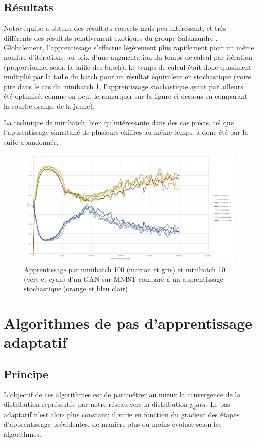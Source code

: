 \subsection{Résultats}
Notre équipe a obtenu des résultats corrects mais peu intéressant, et très différents des résultats relativement exotiques du groupe Salamandre \cite{bouvier_dyvoire_dessine-moi_2018}.
Globalement, l'apprentissage s'effectue légèrement plus rapidement pour un même nombre d'itérations, au prix d'une augmentation du temps de calcul par itération (proportionnel selon la taille des batch). Le temps de calcul était donc quasiment multiplié par la taille du batch pour un résultat équivalent en stochastique (voire pire dans le cas du minibatch 1, l'apprentissage stochastique ayant par ailleurs été optimisé, comme on peut le remarquer sur la figure ci-dessous en comparant la courbe orange de la jaune).

La technique de minibatch, bien qu'intéressante dans des cas précis, tel que l'apprentissage simultané de plusieurs chiffres au même temps, a donc été par la suite abandonnée.

\begin{figure}[h]
\begin{center}
\includegraphics[width=1\textwidth]{images/08-gan_ameliorations_resultats_1.jpg}\caption{Apprentissage par minibatch 100 (marron et gris) et minibatch 10 (vert et cyan) d'un GAN sur MNIST comparé à un apprentissage stochastique (orange et bleu clair)}
\end{center}
\end{figure} 



\section{Algorithmes de pas d'apprentissage adaptatif}
\subsection{Principe}
L'objectif de ces algorithmes est de paramétrer au mieux la convergence de la distribution représentée par notre réseau vers la distribution $p_data$. Le pas adaptatif n'est alors plus constant; il varie en fonction du gradient des étapes d'apprentissage précédentes, de manière plus ou moins évoluée selon les algorithmes.

